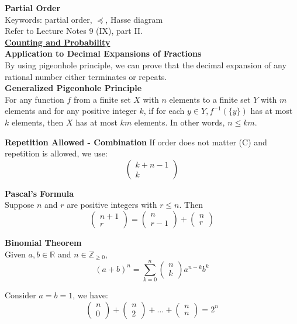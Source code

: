 \documentclass[a4paper]{article}
\newcommand{\heading}[1]{{\small\underline{\textbf{#1}}}}
\newcommand{\subheading}[1]{{\scriptsize\textbf{#1}}}
\begin{document}
\begin{multicols*}{4}
\subheading{Partial Order}\\
Keywords: partial order, $\preceq$, Hasse diagram\\
Refer to Lecture Notes 9 (IX), part II.\\

\heading{Counting and Probability}\\

\subheading{Application to Decimal Expansions of Fractions}\\
By using pigeonhole principle, we can prove that the decimal expansion of any rational number either terminates or repeats.\\

\subheading{Generalized Pigeonhole Principle}\\
For any function $f$ from a finite set $X$ with $n$ elements to a finite set $Y$ with $m$ elements and for any positive integer $k$, if for each $y \in Y, f^{-1}(\{y\})$ has at most $k$ elements, then $X$ has at most $km$ elements. In other words, $n \le km$.

\subheading{Repetition Allowed - Combination}
If order does not matter (C) and repetition is allowed, we use:
$$\begin{pmatrix}
k + n - 1 \\
k
\end{pmatrix}$$

\subheading{Pascal's Formula}\\
Suppose $n$ and $r$ are positive integers with $r \leq n$. Then
$$\begin{pmatrix}n+1\\r\end{pmatrix} = \begin{pmatrix}n\\r-1\end{pmatrix} + \begin{pmatrix}n\\r\end{pmatrix}$$

\subheading{Binomial Theorem}\\
Given $a, b \in \mathbb{R}$ and $n \in \mathbb{Z}_{\geq 0}$,
$$(a+b)^n = \sum_{k=0}^n\begin{pmatrix}n\\k\end{pmatrix}a^{n-k}b^k$$

Consider $a=b=1$, we have:
$$\begin{pmatrix}n\\0\end{pmatrix} + \begin{pmatrix}n\\2\end{pmatrix} + \dots + \begin{pmatrix}n\\n\end{pmatrix} = 2^n$$


\end{multicols*}
\end{document}
